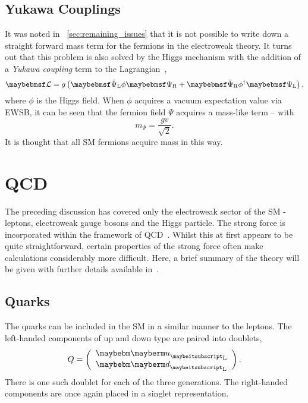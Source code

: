 \subsection{Yukawa Couplings}
\label{sec:theory_yukawa}
It was noted in \sec~\ref{sec:remaining_issues} that it is not possible to write
down a straight forward mass term for the fermions in the electroweak theory. It
turns out that this problem is also solved by the Higgs mechanism with the
addition of a \emph{Yukawa coupling} term to the
Lagrangian~\cite{peskin_schroeder},
\begin{equation*}
\lagrangiand = g \left(\APsiL \phi \PsiR + \APsiR\phi^{\dagger}\PsiL\right),
\end{equation*}
where $\phi$ is the Higgs field. When $\phi$ acquires a vacuum expectation value
via \ac{EWSB}, it can be seen that the fermion field $\Psi$ acquires a mass-like
term -- with
\begin{equation*}
m_{\Psi} = \frac{gv}{\sqrt{2}}.
\end{equation*}
It is thought that all \ac{SM} fermions acquire mass in this way.

\section{\acl{QCD}}
\label{sec:sm_qcd}
The preceding discussion has covered only the electroweak sector of the \ac{SM}
- leptons, electroweak gauge bosons and the Higgs particle. The strong force is
incorporated within the framework of \ac{QCD}~\cite{peskin_schroeder,pink_book}.
Whilst this at first appears to be quite straightforward, certain properties of
the strong force often make calculations considerably more difficult. Here, a
brief summary of the theory will be given with further details available
in~\cite{pink_book}.

\subsection{Quarks}
The quarks can be included in the \ac{SM} in a similar manner to the
leptons. The left-handed components of up and down type are paired into doublets,
\begin{equation*}
Q=\left(\begin{array}{c}\Pup_{\textrm{L}} \\ \Pdown_{\textrm{L}}\end{array}\right).
\end{equation*}
There is one such doublet for each of the three generations. The right-handed
components are once again placed in a singlet representation.

